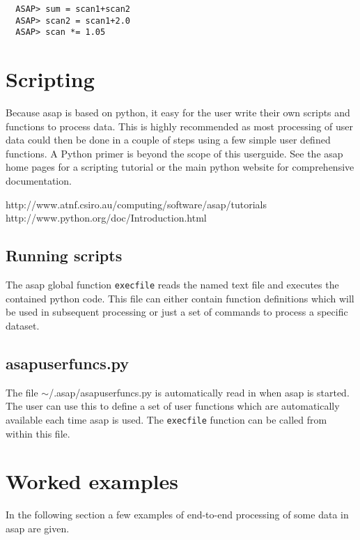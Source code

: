 \documentclass[11pt]{article}
\newcommand{\cmd}[1]{{\tt #1}}
\begin{document}
\begin{verbatim}
  ASAP> sum = scan1+scan2
  ASAP> scan2 = scan1+2.0
  ASAP> scan *= 1.05
\end{verbatim}

\section{Scripting}

Because asap is based on python, it easy for the user
write their own scripts and functions to process data. This is highly
recommended as most processing of user data could then be done in a
couple of steps using a few simple user defined functions. A Python
primer is beyond the scope of this userguide. See the asap home pages
for a scripting tutorial or the main python website for comprehensive
documentation.

\hspace{1cm} http://www.atnf.csiro.au/computing/software/asap/tutorials
\hspace{1cm} http://www.python.org/doc/Introduction.html

\subsection{Running scripts}

The asap global function \cmd{execfile} reads the named text file and
executes the contained python code. This file can either contain
function definitions which will be used in subsequent processing or
just a set of commands to process a specific dataset.

\subsection{asapuserfuncs.py}

The file $\sim$/.asap/asapuserfuncs.py is automatically read in when
asap is started. The user can use this to define a set of user
functions which are automatically available each time asap is
used. The \cmd{execfile} function can be called from within this file.

\section{Worked examples}

In the following section a few examples of end-to-end processing of
some data in asap are given.
\end{document}

